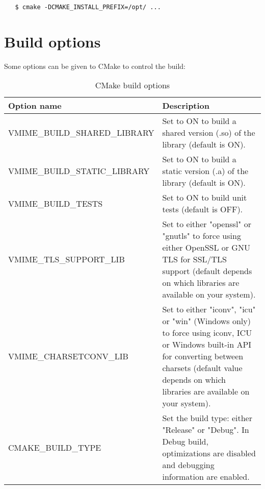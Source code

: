 \begin{verbatim}
   $ cmake -DCMAKE_INSTALL_PREFIX=/opt/ ...
\end{verbatim}


\section{\label{build-options}Build options}

Some options can be given to CMake to control the build:

\begin{table}[!ht]
\noindent\begin{tabularx}{1.0\textwidth}{|l|X|}
\hline
	{\bf Option name} &
	{\bf Description} \\
\hline
\hline
VMIME\_BUILD\_SHARED\_LIBRARY &
Set to ON to build a shared version (.so) of the library (default is ON). \\
\hline
VMIME\_BUILD\_STATIC\_LIBRARY &
Set to ON to build a static version (.a) of the library (default is ON). \\
\hline
VMIME\_BUILD\_TESTS &
Set to ON to build unit tests (default is OFF). \\
\hline
VMIME\_TLS\_SUPPORT\_LIB &
Set to either "openssl" or "gnutls" to force using either OpenSSL or GNU TLS
for SSL/TLS support (default depends on which libraries are available on
your system). \\
\hline
VMIME\_CHARSETCONV\_LIB &
Set to either "iconv", "icu" or "win" (Windows only) to force using iconv, ICU
or Windows built-in API for converting between charsets (default value depends
on which libraries are available on your system). \\
\hline
CMAKE\_BUILD\_TYPE &
Set the build type: either "Release" or "Debug". In Debug build, optimizations
are disabled and debugging information are enabled. \\
\hline
\end{tabularx}
\caption{CMake build options}
\end{table}
